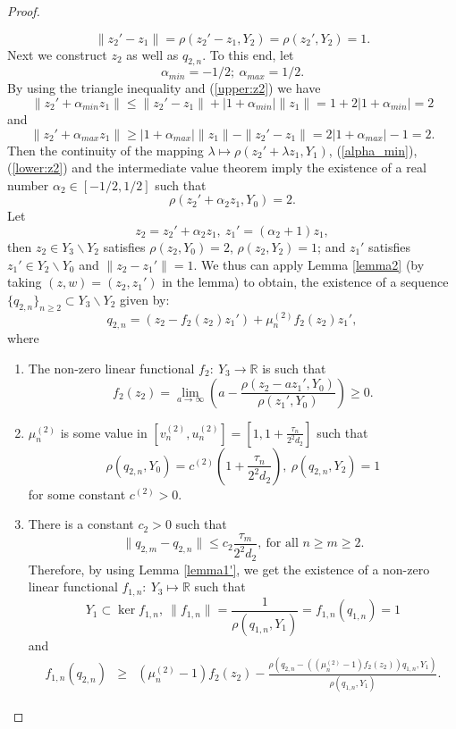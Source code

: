 \documentclass[12pt, reqno]{amsart}
\theoremstyle{definition}
\theoremstyle{remark}
\numberwithin{equation}{section}
\begin{document}
\begin{proof}
\begin{itemize}
\begin{equation}
\label{upper:z2}
\|z_2'-z_1\|=\rho(z_2'-z_1,Y_2)=\rho(z_2',Y_2)=1.
\end{equation}
Next we construct $z_2$ as well as $q_{2,n}$. To this end, let
$$
\alpha_{min}=-1/2;~\alpha_{max}=1/2.
$$
By using the triangle inequality and (\ref{upper:z2}) we have
\begin{equation}
\label{alpha_min}
\|z_2'+\alpha_{min}z_1\|\le \|z_2'-z_1\|+|1+\alpha_{min}|\|z_1\|=1+2|1+\alpha_{min}|=2
\end{equation}
and
\begin{equation}
    \label{lower:z2}
    \|z_2'+\alpha_{max} z_1\|\ge|1+\alpha_{max}|\|z_1\|-\|z_2'-z_1\|=2|1+\alpha_{max}|-1=2.
    \end{equation}
Then the continuity of the mapping $\lambda\mapsto \rho(z_2'+\lambda z_1,Y_1)$,  (\ref{alpha_min}), (\ref{lower:z2}) and the intermediate value theorem imply the existence of a real number $\alpha_2\in[-1/2,1/2]$ such that
$$
\rho(z_2'+\alpha_2z_1,Y_0)=2.
$$
Let
$$
z_2=z_2'+\alpha_2z_1,~z_1'=(\alpha_2+1)z_1,
$$ then  $z_2\in Y_3\backslash Y_2$ satisfies $\rho(z_2,Y_0)=2$, $\rho(z_2,Y_2)=1$; and $z_1'$ satisfies $z_1'\in Y_2\backslash Y_0$ and $\|z_2-z_1'\|=1$. We thus can apply Lemma \ref{lemma2} (by taking $(z,w)=(z_2,z_1')$ in the lemma) to obtain, the existence of a sequence $\{q_{2,n}\}_{n\ge 2}\subset Y_{3}\backslash Y_2$ given by:
$$
q_{2,n}=(z_2-f_2(z_2)z_1')+\mu_n^{(2)}f_2(z_2)z_1',
$$
where
\renewcommand{\labelenumi}{\alph{enumi})}
\begin{enumerate}
    \item[(i)] The non-zero linear functional
     $f_2:~Y_3\rightarrow \mathbb R$ is such that 
     $$
     f_2(z_2)=\lim\limits_{a\to\infty}\left(a-\frac{\rho(z_2-az_1',Y_0)}{\rho(z_1',Y_0)}\right)\ge 0.
     $$
    \item[(ii)] $\mu_n^{(2)}$ is some value in $[v_n^{(2)},u_n^{(2)}]=\left[1,1+\frac{\tau_n}{2^2d_2}\right]$ such that
    $$
\rho(q_{2,n},Y_0)=c^{(2)}\left(1+\frac{\tau_n}{2^2d_2}\right),~\rho(q_{2,n},Y_2)=1
$$
for some constant $c^{(2)}>0$.
\item[(iii)] There is a constant $c_2>0$ such that
$$
\|q_{2,m}-q_{2,n}\|\le c_2\frac{\tau_m}{2^2d_2},~\mbox{for all $n\ge m\ge 2$}.
$$
Therefore, by using Lemma \ref{lemma1'},  we get the existence of a non-zero linear functional $f_{1,n}:~Y_{3}\longmapsto\mathbb R$ such that
$$
Y_1\subset \ker f_{1,n},~\|f_{1,n}\|=\frac{1}{\rho(q_{1,n},Y_1)}=f_{1,n}(q_{1,n})=1
$$
and
\begin{eqnarray*}
f_{1,n}(q_{2,n})&\ge&(\mu_n^{(2)}-1)f_2(z_2)-\frac{\rho\left(q_{2,n}-((\mu_n^{(2)}-1)f_2(z_2))q_{1,n},Y_1\right)}{\rho(q_{1,n},Y_1)}.

\end{eqnarray*}
\end{enumerate}
\end{itemize}
\end{proof}
\end{document}
